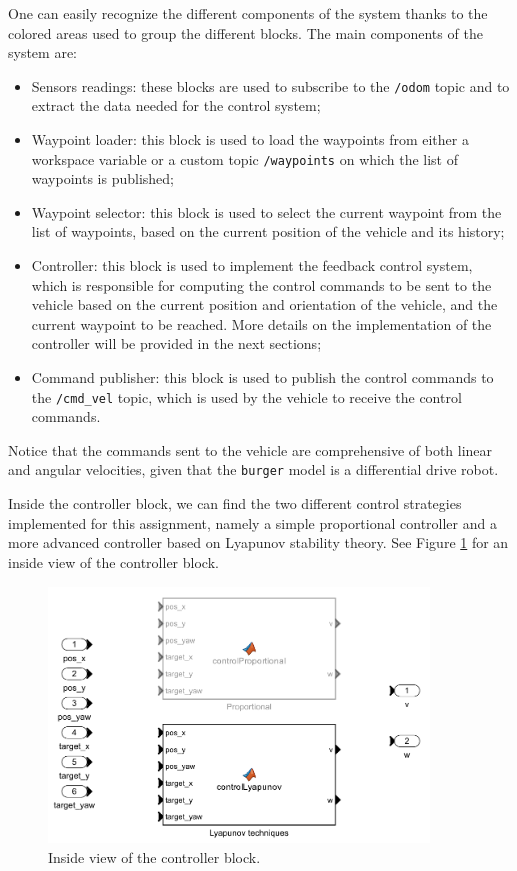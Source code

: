 One can easily recognize the different components of the system thanks to the colored areas used to group the different blocks.
The main components of the system are:

\begin{itemize}
    \item Sensors readings: these blocks are used to subscribe to the \texttt{/odom} topic and to extract the data needed for the control system;
    \item Waypoint loader: this block is used to load the waypoints from either a workspace variable or a custom topic \texttt{/waypoints} on which the list of waypoints is published;
    \item Waypoint selector: this block is used to select the current waypoint from the list of waypoints, based on the current position of the vehicle and its history;
    \item Controller: this block is used to implement the feedback control system, which is responsible for computing the control commands to be sent to the vehicle based on the current position and orientation of the vehicle, and the current waypoint to be reached. More details on the implementation of the controller will be provided in the next sections;
    \item Command publisher: this block is used to publish the control commands to the \texttt{/cmd\_vel} topic, which is used by the vehicle to receive the control commands.
\end{itemize}

Notice that the commands sent to the vehicle are comprehensive of both linear and angular velocities, given that the \texttt{burger} model is a differential drive robot.

Inside the controller block, we can find the two different control strategies implemented for this assignment, namely a simple proportional controller and a more advanced controller based on Lyapunov stability theory.
See Figure \ref{fig:controller_block} for an inside view of the controller block.

\begin{figure}[H]
    \centering
    \includegraphics[width=0.9\textwidth]{./img/MATLAB/controller.pdf}
    \caption{Inside view of the controller block.}
    \label{fig:controller_block}
\end{figure}
